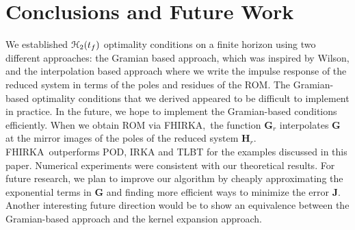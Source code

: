 \documentclass[preprint]{elsarticle}
\theoremstyle{definition}
\theoremstyle{definition}
\def\mathcal{\EuScript}
\numberwithin{equation}{section}
\newcommand{\FH}{FHIRKA}
\newcommand{\G}{\mathbf{G}}
\newcommand{\HH}{\mathbf{H}}
\newcommand{\J}{\mathbf{J}}
\newcommand{\tf}{t_f}
\newcommand{\rc}{\boldsymbol{r}}
\newcommand{\lc}{\boldsymbol{\ell}}
\newcommand{\ch}{\mathcal{H}}
\begin{document}
\section{Conclusions and Future Work} \label{sec:conc}
We established $\ch_2({\tf})$ optimality conditions on a finite horizon using two different approaches: the Gramian based approach, which was inspired by Wilson, and the interpolation based approach where we write the impulse response of the reduced system in terms of the poles and residues of the ROM. The Gramian-based optimality conditions that we derived appeared to be difficult to implement in practice. In the future, we hope to implement the Gramian-based conditions efficiently.   When we obtain ROM via \FH,\ the function $\G_r$ interpolates $\G$ at the mirror images of the poles of the reduced system $\HH_r$.  \FH\ outperforms POD, IRKA and TLBT for the examples discussed in this paper. Numerical experiments were consistent with our theoretical results. For future research, we plan to improve our algorithm by cheaply approximating the exponential terms in $\G$ and finding more efficient ways to minimize the error $\J$. Another interesting future direction would be to show an equivalence between the Gramian-based approach and the kernel expansion approach.








\end{document}

